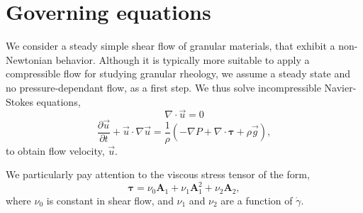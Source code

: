 \section{Governing equations}
We consider a steady simple shear flow of granular materials, that exhibit a non-Newtonian behavior. Although it is typically more suitable to apply a compressible flow for studying granular rheology, we assume a steady state and no pressure-dependant flow, as a first step. 
We thus solve incompressible Navier-Stokes equations,
\begin{equation}
  \nabla \cdot \vec{u} = 0 
  \label{eq_div_free} 
\end{equation}
\begin{equation}
     \frac{\partial \vec{u}}{\partial t} + \vec{u}\cdot \nabla \vec{u}
= \frac{1}{\rho}
\left(
- \nabla P 
    + \nabla \cdot   \bm{\tau} 
    +  \rho  \vec{g} 
    \right),
  \label{eq_NS_ch4}
  \end{equation}
to obtain flow velocity, $\vec{u}$.

We particularly pay attention to the viscous stress tensor of the form,
\begin{equation}
   \boldsymbol{\tau} = 
    \nu_0  \bm{A}_1 +  \nu_1  \bm{A}_1^2 + \nu_2 \bm{A}_2,
   \label{eq_CN_tau}
\end{equation}
where $\nu_0$ is constant in shear flow, and $\nu_1$ and $\nu_2$ are a function of $\dot{\gamma}$.
